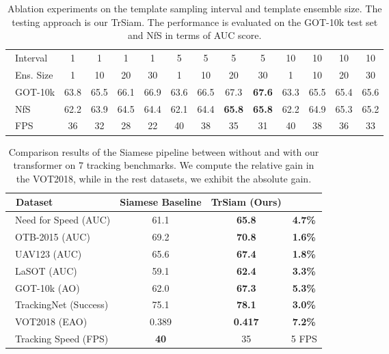\documentclass[10pt,twocolumn,letterpaper]{article}
\begin{document}
\setlength{\tabcolsep}{2pt}
\begin{table}[t]
	\scriptsize
	\begin{center}
		\caption{Ablation experiments on the template sampling interval and template ensemble size. The testing approach is our TrSiam. The performance is evaluated on the GOT-10k test set \cite{GOT10k} and NfS \cite{NFSdataset} in terms of AUC score.} \label{table:interval}	
		\vspace{+0.05in}
		\begin{tabular*}{8.3 cm} {@{\extracolsep{\fill}}l|cccc|cccc|cccc}
			\hline
			~Interval &1 &1 &1 &1 &5 &5 &5 &5 & 10 &10 &10 &10 \\
			~Ens. Size &1 &10 &20 &30 &1 &10 &20 &30 &1 &10 &20 &30  \\
			\hline
			~GOT-10k &63.8 &65.5 &66.1 &66.9 &63.6 &66.5 &67.3 &{\bf 67.6} &63.3 &65.5 &65.4 &65.6\\
			~NfS &62.2 &63.9 &64.5 &64.4 &62.1 &64.4 &{\bf 65.8} &{\bf 65.8} &62.2 &64.9 &65.3 &65.2\\
			\hline
			~FPS &36 &32 &28 &22 &40 &38 &35 &31 &40 &38 &36 &33 \\
			\hline
		\end{tabular*}
	\end{center}
	\vspace{-0.05in}
\end{table} 


\setlength{\tabcolsep}{2pt}
\begin{table}[t]
	\scriptsize
	\begin{center}
		\caption{Comparison results of the Siamese pipeline between without and with our transformer on 7 tracking benchmarks. We compute the relative gain in the VOT2018, while in the rest datasets, we exhibit the absolute gain.} \label{table:siam_ablation}	
		\vspace{+0.05in} 
		\begin{tabular*}{8.2 cm} {@{\extracolsep{\fill}}lccc}
			\hline
			~Dataset &Siamese Baseline &{\bf TrSiam (Ours)} &\\
			\hline
			~Need for Speed \cite{NFSdataset} (AUC) &61.1 &\bf 65.8  &\bf 4.7\% \\
			~OTB-2015 \cite{OTB-2015} (AUC)  &69.2 &\bf 70.8   &\bf 1.6\%\\
			~UAV123 \cite{UAV123} (AUC)  &65.6 &\bf 67.4   &\bf 1.8\%\\
			~LaSOT \cite{LaSOT} (AUC)  &59.1 &\bf 62.4  &\bf 3.3\%\\
			~GOT-10k \cite{GOT10k} (AO) &62.0 &\bf 67.3  &\bf 5.3\%\\
			~TrackingNet \cite{2018trackingnet} (Success) &75.1 &\bf 78.1  &\bf 3.0\%\\
			~VOT2018 \cite{VOT2018} (EAO)  &0.389 &\bf 0.417  &\bf 7.2\% \\
			\hline
			~Tracking Speed (FPS) &\bf 40  &35 & 5 FPS  \\
			\hline
		\end{tabular*}
	\end{center}
	\vspace{-0.05in}
\end{table} 
\end{document}
